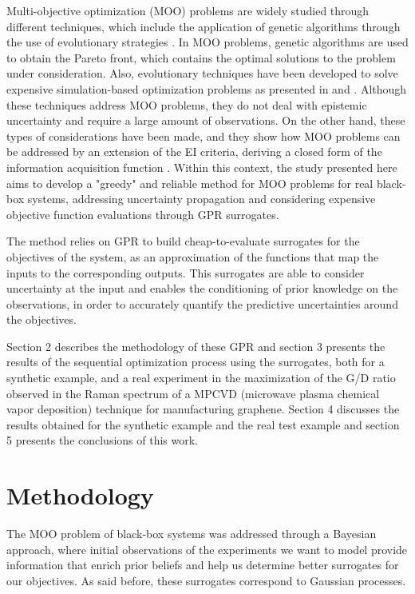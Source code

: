 \documentclass{article}
\begin{document}
Multi-objective optimization (MOO) problems are widely studied through different techniques, which include the application of genetic algorithms through the use of evolutionary strategies \cite{Costa2006}. In MOO problems, genetic algorithms are used to obtain the Pareto front, which contains the optimal solutions to the problem under consideration. Also, evolutionary techniques have been developed to solve expensive simulation-based optimization problems as presented in \cite{Guo2007} and \cite{Huang2009}. Although these techniques address MOO problems, they do not deal with epistemic uncertainty and require a large amount of observations. On the other hand, these types of considerations have been made, and they show how MOO problems can be addressed by an extension of the EI criteria, deriving a closed form of the information acquisition function \cite{wagner2010expected}. Within this context, the study presented here aims to develop a "greedy" and reliable method for MOO problems for real black-box systems, addressing uncertainty propagation and considering expensive objective function evaluations through GPR surrogates.

The method relies on GPR to build cheap-to-evaluate surrogates for the objectives of the system, as an approximation of the functions that map the inputs to the corresponding outputs. This surrogates are able to consider uncertainty at the input and enables the conditioning of prior knowledge on the observations, in order to accurately quantify the predictive uncertainties around the objectives.

Section 2 describes the methodology of these GPR and section 3 presents the results of the sequential optimization process using the surrogates, both for a synthetic example, and a real experiment in the maximization of the G/D ratio observed in the Raman spectrum of a MPCVD (microwave plasma chemical vapor deposition) technique for manufacturing graphene. Section 4 discusses the results obtained for the synthetic example and the real test example and section 5 presents the conclusions of this work.

\section{Methodology}

The MOO problem of black-box systems was addressed through a Bayesian approach, where initial observations of the experiments we want to model provide information that enrich prior beliefs and help us determine better surrogates for our objectives. As said before, these surrogates correspond to Gaussian processes.
\end{document}
